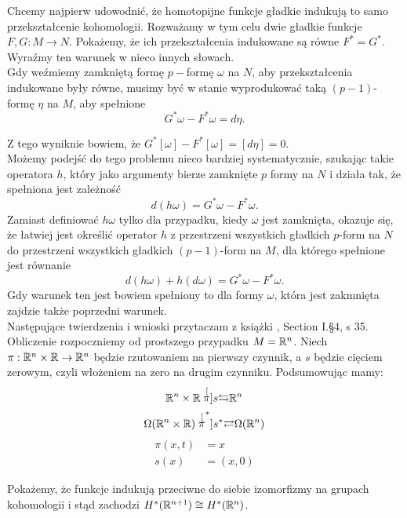\documentclass[licencjacka]{pracamgr}
\theoremstyle{definition}
\theoremstyle{definition}
\theoremstyle{plain}
\theoremstyle{plain}
\theoremstyle{plain}
\theoremstyle{plain}
\def\R{\ensuremath\mathbb{R}}
\begin{document}
Chcemy najpierw udowodnić, że homotopijne funkcje gładkie indukują to samo
przekształcenie kohomologii.  Rozważamy w tym celu dwie gładkie funkcje $F, G:
M \rightarrow N$.  Pokażemy, że ich przekształcenia indukowane są równe
$F^\ast = G^\ast$. Wyraźmy ten warunek w nieco innych słowach. \\

Gdy weźmiemy zamkniętą formę $p-$formę $\omega$ na $N$, aby
przekształcenia indukowane były równe, musimy być w stanie
wyprodukować taką $(p-1)$-formę $\eta$ na $M$, aby spełnione
\[
    G^\ast \omega - F^\ast \omega = d\eta.
\]

Z tego wyniknie bowiem, że
$ G^\ast [\omega] - F^\ast [\omega] =
[d\eta] = 0$. \\

Możemy podejść do tego problemu nieco bardziej systematycznie, 
szukając takie operatora
$h$, który jako argumenty bierze zamknięte $p$ formy na $N$
i działa tak, że spełniona jest zależność
\[
    d(h\omega) = G^\ast \omega - F^\ast \omega.
\] 
Zamiast definiować $h \omega$ tylko dla przypadku, kiedy $\omega$
jest zamknięta, okazuje się, że łatwiej jest określić operator
$h$ z przestrzeni wszystkich gładkich $p$-form na $N$
do przestrzeni wszystkich gładkich $(p-1)$-form na $M$,
dla którego spełnione jest równanie
\[
    d(h\omega) + h(d\omega) = G^\ast \omega - F^\ast \omega.
\]
Gdy warunek ten jest bowiem spełniony to dla formy $\omega$, która
jest zakmnięta zajdzie także poprzedni warunek. \\

Następujące twierdzenia i wnioski przytaczam z książki \cite{bott}, Section
I.\S4, s 35. \\

Obliczenie rozpoczniemy od prostszego przypadku $M = \R^n$.
Niech $\pi: \R^n \times \R \rightarrow \R^n$  będzie rzutowaniem
na pierwszy czynnik, a $s$  będzie cięciem zerowym, czyli włożeniem
na zero na drugim czynniku. Podsumowując mamy:
\[
 \R^n \times \R
 \stackrel[\pi]{s}{\leftrightarrows} 
 \R^n
\]
\[
 \Omega (\R^n \times \R)
 \stackrel[\pi^\ast]{s^\ast}{\rightleftarrows} 
 \Omega(\R^n)
\]
\begin{align*}
    \pi(x, t) &= x \\
         s(x) &= (x, 0)
\end{align*}

Pokażemy, że funkcje indukują przeciwne do siebie izomorfizmy na
grupach kohomologii i stąd zachodzi $H^\ast(\R^{n+1}) \cong H^\ast(\R^{n})$. \\
\end{document}
